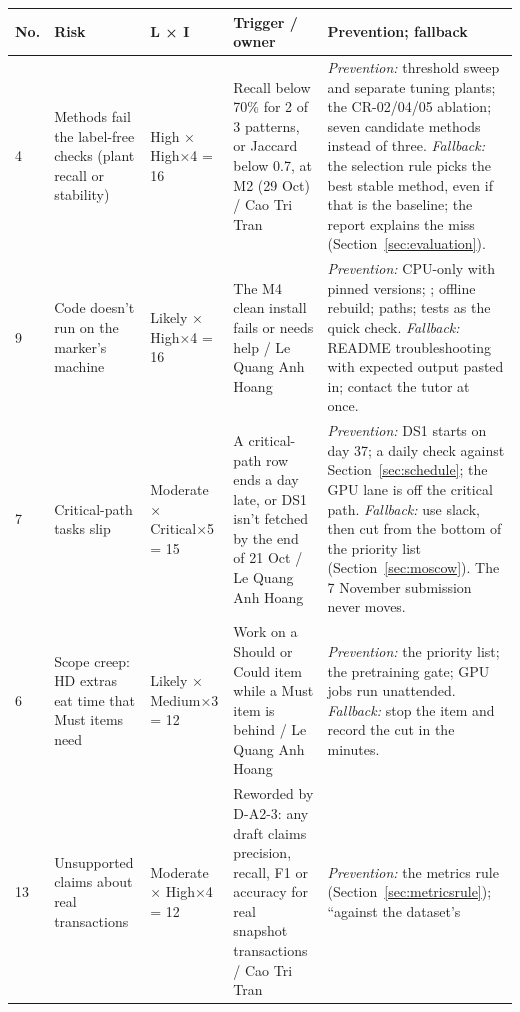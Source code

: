 {\small
\begin{longtable}{@{}L{0.7cm}L{3.2cm}L{2.0cm}L{3.4cm}L{4.6cm}@{}}
\toprule
\textbf{No.} & \textbf{Risk} & \textbf{L × I} & \textbf{Trigger / owner} & \textbf{Prevention; fallback} \\
\midrule
{} & Methods fail the label-free checks (plant recall or stability) & High × High×4 = 16 &
Recall below 70\% for 2 of 3 patterns, or Jaccard below 0.7, at M2 (29 Oct) / Cao Tri Tran &
\textit{Prevention:} threshold sweep and separate tuning plants; the CR-02/04/05 ablation; seven
candidate methods instead of three. \textit{Fallback:} the selection rule picks the best stable
method, even if that is the baseline; the report explains the miss (Section~\ref{sec:evaluation}). \\
9 & Code doesn't run on the marker's machine & Likely × High×4 = 16 &
The M4 clean install fails or needs help / Le Quang Anh Hoang &
\textit{Prevention:} CPU-only  with pinned versions; ;
offline rebuild;  paths; tests as the quick check. \textit{Fallback:} README
troubleshooting with expected output pasted in; contact the tutor at once. \\
7 & Critical-path tasks slip & Moderate × Critical×5 = 15 &
A critical-path row ends a day late, or DS1 isn't fetched by the end of 21 Oct / Le Quang Anh Hoang &
\textit{Prevention:} DS1 starts on day 37; a daily check against Section~\ref{sec:schedule}; the
GPU lane is off the critical path. \textit{Fallback:} use slack, then cut from the bottom of the
priority list (Section~\ref{sec:moscow}). The 7 November submission never moves. \\
6 & Scope creep: HD extras eat time that Must items need & Likely × Medium×3 = 12 &
Work on a Should or Could item while a Must item is behind / Le Quang Anh Hoang &
\textit{Prevention:} the priority list; the pretraining gate; GPU jobs run unattended.
\textit{Fallback:} stop the item and record the cut in the minutes. \\
13 & Unsupported claims about real transactions & Moderate × High×4 = 12 &
Reworded by D-A2-3: any draft claims precision, recall, F1 or accuracy for real snapshot
transactions / Cao Tri Tran &
\textit{Prevention:} the metrics rule (Section~\ref{sec:metricsrule}); ``against the dataset's

\end{longtable}}
